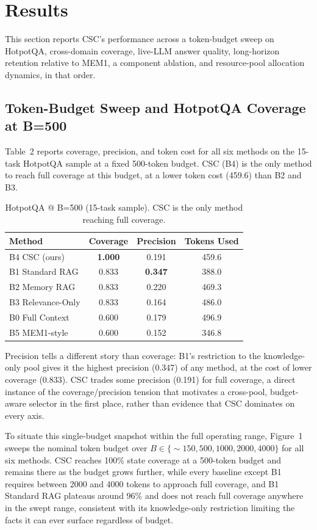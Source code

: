 \documentclass{article}
\begin{document}
\section{Results}

This section reports CSC's performance across a token-budget sweep on HotpotQA, cross-domain coverage, live-LLM answer quality, long-horizon retention relative to MEM1, a component ablation, and resource-pool allocation dynamics, in that order.

\subsection{Token-Budget Sweep and HotpotQA Coverage at B=500}

Table~2 reports coverage, precision, and token cost for all six methods on the 15-task HotpotQA sample at a fixed 500-token budget. CSC (B4) is the only method to reach full coverage at this budget, at a lower token cost (459.6) than B2 and B3.

\begin{table}[t]
\caption{HotpotQA @ B=500 (15-task sample). CSC is the only method reaching full coverage.}
\centering
\begin{tabular}{lccc}
\toprule
Method & Coverage & Precision & Tokens Used \\
\midrule
B4 CSC (ours) & \textbf{1.000} & 0.191 & 459.6 \\
B1 Standard RAG & 0.833 & \textbf{0.347} & 388.0 \\
B2 Memory RAG & 0.833 & 0.220 & 469.3 \\
B3 Relevance-Only & 0.833 & 0.164 & 486.0 \\
B0 Full Context & 0.600 & 0.179 & 496.9 \\
B5 MEM1-style & 0.600 & 0.152 & 346.8 \\
\bottomrule
\end{tabular}
\end{table}

Precision tells a different story than coverage: B1's restriction to the knowledge-only pool gives it the highest precision (0.347) of any method, at the cost of lower coverage (0.833). CSC trades some precision (0.191) for full coverage, a direct instance of the coverage/precision tension that motivates a cross-pool, budget-aware selector in the first place, rather than evidence that CSC dominates on every axis.

To situate this single-budget snapshot within the full operating range, Figure~1 sweeps the nominal token budget over $B \in \{\sim\!150, 500, 1000, 2000, 4000\}$ for all six methods. CSC reaches 100\% state coverage at a 500-token budget and remains there as the budget grows further, while every baseline except B1 requires between 2000 and 4000 tokens to approach full coverage, and B1 Standard RAG plateaus around 96\% and does not reach full coverage anywhere in the swept range, consistent with its knowledge-only restriction limiting the facts it can ever surface regardless of budget.
\end{document}
